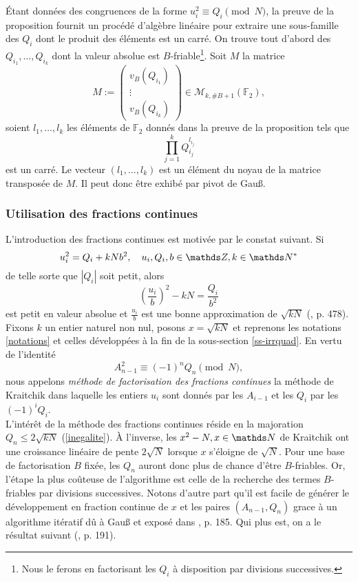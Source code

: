 Étant données des congruences de la forme $u_i^2 \equiv Q_i \pmod{N}$, la
preuve de la proposition fournit un procédé d'algèbre linéaire pour extraire
une sous-famille des $Q_i$ dont le produit des éléments est un carré. On trouve
tout d'abord des $Q_{i_1}, \dots, Q_{i_k}$ dont la valeur absolue est
$B$-friable\footnote{Nous le ferons en factorisant les $Q_i$ à disposition par
divisions successives.}. Soit $M$ la matrice \[M := \begin{pmatrix}
v_B(Q_{i_1}) \\ \vdots \\ v_B(Q_{i_k})\end{pmatrix}\in \mathcal{M}_{k,
\#B+1}(\mathbb{F}_2),\] soient $l_{1}, \dots, l_{k}$ les éléments de
$\mathbb{F}_2$ donnés dans la preuve de la proposition tels que \[\prod_{j=1}^k
Q_{i_j}^{l_{i_j}}\] est un carré. Le vecteur $(l_1, \dots, l_{k})$ est un
élément du noyau de la matrice transposée de $M$. Il peut donc être exhibé 
par pivot de Gau\ss{}.

\subsubsection{Utilisation des fractions continues}

L'introduction des fractions continues est motivée par le constat suivant. Si
\[u_i^2 = Q_i + kNb^2, \quad u_i, Q_i, b\in \Z, k\in \N^*\] de telle sorte que
$| Q_i |$ soit petit, alors \[\left(\frac{u_i}{b}\right)^2 - kN =
\frac{Q_i}{b^2}\] est petit en valeur absolue et $\frac{u_i}{b}$ est une bonne
approximation de $\sqrt{kN}$ (\cite{Cohen}, p. 478). Fixons $k$ un entier
naturel non nul, posons $x = \sqrt{kN}$ et reprenons les notations
\ref{notations} et celles développées à la fin de la sous-section
\ref{ss-irrquad}. En vertu de l'identité \[A_{n-1}^2 \equiv (-1)^n Q_n
\pmod{N},\] nous appelons \emph{méthode de factorisation des fractions
continues} la méthode de Kraitchik dans laquelle les entiers $u_i$ sont donnés
par les $A_{i-1}$ et les $Q_i$ par les $(-1)^i Q_i$. \\

L'intérêt de la méthode des fractions continues réside en la majoration $Q_n
\leq 2\sqrt{kN}$ (\ref{inegalite}). À l'inverse, les $x^2 - N, x\in \N$ de
Kraitchik ont une croissance linéaire de pente $2\sqrt{N}$ lorsque $x$
s'éloigne de $\sqrt{N}$. Pour une base de factorisation $B$ fixée, les $Q_n$
auront donc plus de chance d'être $B$-friables. Or, l'étape la plus coûteuse de
l'algorithme est celle de la recherche des termes $B$-friables par divisions
successives. Notons d'autre part qu'il est facile de générer le développement
en fraction continue de $x$ et les paires $(A_{n-1}, Q_n)$ grace à un
algorithme itératif dû à Gau\ss{} et exposé dans \cite{MB}, p. 185. Qui plus
est, on a le résultat suivant (\cite{MB}, p. 191).

